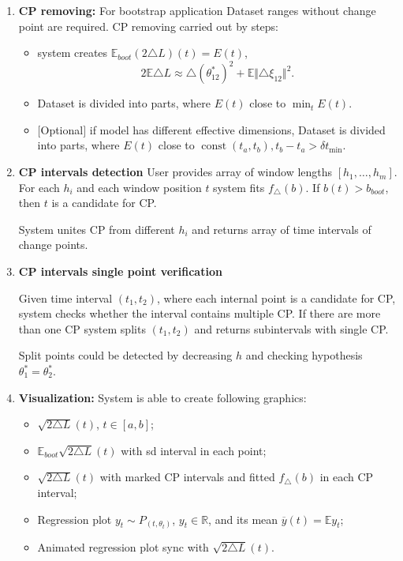 \documentclass[a4paper,12pt]{report} %
\theoremstyle{definition}
\newcommand{\const}{\ensuremath{\mathop{\mathrm{const}}}\nolimits}
\newcommand{\Exp}{\ensuremath{\mathrm{{\mathbb E}}}}
\begin{document}
\begin{enumerate}
\item \textbf{CP removing:}
For bootstrap application Dataset ranges without change point are required. CP removing carried out by steps:
\begin{itemize}
\item system creates $\Exp_{boot} (2 \triangle L)(t) = E(t)$,
\[
 2 \Exp \triangle L \approx \triangle (\theta^*_{12})^2 + \Exp \Vert\triangle \xi_{12} \Vert^2. 
\]
\item Dataset is divided into parts, where  $E(t)$ close to $\min_t E(t)$.
\item $[$Optional$]$ if model has different effective dimensions,  Dataset is divided into parts, where  $E(t)$ close to $\const(t_a, t_b), t_b - t_a > \delta t_{\min}$.
\end{itemize} 

\item \textbf{CP intervals detection}
User provides array of window lengths $[h_1, \ldots, h_m]$. For each $h_i$ and each window position $t$ system fits $f_\triangle(b)$. If $b(t) > b_{boot}$, then $t$ is a candidate for CP. 
  
System unites CP from different $h_i$ and returns array of time intervals of change points. 

\item \textbf{CP intervals single point verification} 

Given time interval $(t_1, t_2)$, where each internal point is a candidate for CP, system checks whether the interval contains multiple CP. If there are more than one CP system splits $(t_1, t_2)$ and returns subintervals with single CP. 

 Split points could be detected by decreasing $h$ and checking hypothesis $\theta_1^* = \theta_2^*$. 

\item \textbf{Visualization: } 
System is able to create following graphics:

\begin{itemize}
\item $\sqrt{2 \triangle L}(t)$, $t \in [a,b]$;
\item $\Exp_{boot} \sqrt{2 \triangle L}(t)$ with sd interval in each point;
\item $\sqrt{2 \triangle L}(t)$ with marked CP intervals and fitted $f_{\triangle}(b)$ in each CP interval;
\item Regression plot $y_t \sim P_{(t,\theta_t)}$, $y_t \in \mathbb{R}$, and its mean 
$\overline{y}(t) = \Exp y_t$;
\item Animated regression plot sync with $\sqrt{2 \triangle L}(t)$.  
\end{itemize}


\end{enumerate}
\end{document}
